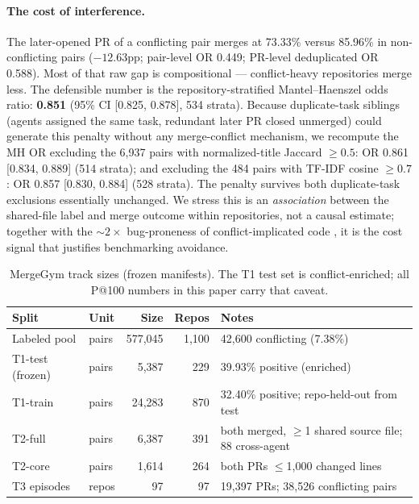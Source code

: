 \documentclass{article}
\begin{document}
\paragraph{The cost of interference.} The later-opened PR of a conflicting pair merges at 73.33\% versus 85.96\% in non-conflicting pairs ($-12.63$pp; pair-level OR 0.449; PR-level deduplicated OR 0.588). %
Most of that raw gap is compositional --- conflict-heavy repositories merge less. The defensible number is the repository-stratified Mantel--Haenszel odds ratio: \textbf{0.851} (95\% CI [0.825, 0.878], 534 strata). %
Because duplicate-task siblings (agents assigned the same task, redundant later PR closed unmerged) could generate this penalty without any merge-conflict mechanism, we recompute the MH OR excluding the 6{,}937 pairs with normalized-title Jaccard $\geq 0.5$: OR 0.861 [0.834, 0.889] (514 strata); and excluding the 484 pairs with TF-IDF cosine $\geq 0.7$: OR 0.857 [0.830, 0.884] (528 strata). %
The penalty survives both duplicate-task exclusions essentially unchanged. We stress this is an \emph{association} between the shared-file label and merge outcome within repositories, not a causal estimate; together with the $\sim 2\times$ bug-proneness of conflict-implicated code \citep{brindescu2020emse}, it is the cost signal that justifies benchmarking avoidance.

\begin{table}[t]
\centering
\caption{MergeGym track sizes (frozen manifests). The T1 test set is conflict-enriched; all P@100 numbers in this paper carry that caveat.}
\label{tab:sizes}
\small
\begin{tabular}{llrrl}
\toprule
Split & Unit & Size & Repos & Notes \\
\midrule
Labeled pool & pairs & 577{,}045 & 1{,}100 & 42{,}600 conflicting (7.38\%) \\ %
T1-test (frozen) & pairs & 5{,}387 & 229 & 39.93\% positive (enriched) \\ %
T1-train & pairs & 24{,}283 & 870 & 32.40\% positive; repo-held-out from test \\ %
T2-full & pairs & 6{,}387 & 391 & both merged, $\geq$1 shared source file; 88 cross-agent \\ %
T2-core & pairs & 1{,}614 & 264 & both PRs $\leq$1{,}000 changed lines \\ %
T3 episodes & repos & 97 & 97 & 19{,}397 PRs; 38{,}526 conflicting pairs \\ %
\bottomrule
\end{tabular}
\end{table}
\end{document}
